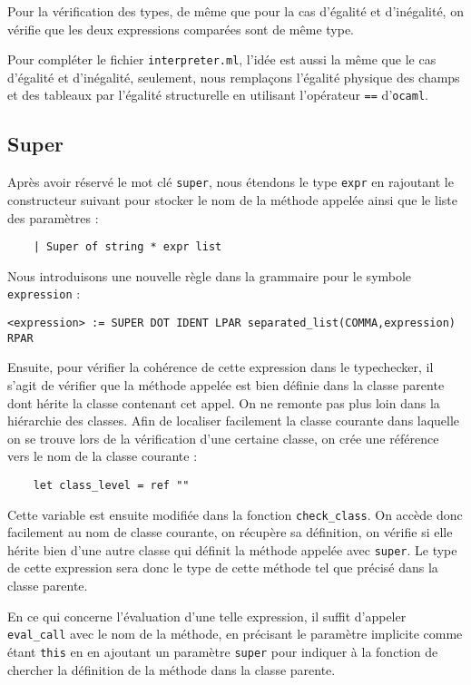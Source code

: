 \documentclass{article}
\begin{document}
Pour la vérification des types, de même que pour la cas d'égalité et d'inégalité, on vérifie que les deux expressions comparées sont de même type.

Pour compléter le fichier \texttt{interpreter.ml}, l'idée est aussi la même que le cas d'égalité et d'inégalité, seulement, 
nous remplaçons l'égalité physique des champs et des tableaux par l'égalité structurelle en utilisant l'opérateur \texttt{==} d'\texttt{ocaml}.

\subsection{Super}
Après avoir réservé le mot clé \texttt{super}, nous étendons le type \texttt{expr} en rajoutant 
le constructeur suivant pour stocker le nom de la méthode appelée ainsi que le liste des paramètres : 
\begin{verbatim}
    | Super of string * expr list
\end{verbatim}

Nous introduisons une nouvelle règle dans la grammaire pour le symbole \texttt{expression} : 
\begin{lstlisting}[style=mystyle]
    <expression> := SUPER DOT IDENT LPAR separated_list(COMMA,expression) RPAR 
\end{lstlisting}

Ensuite, pour vérifier la cohérence de cette expression dans le typechecker, il s'agit de vérifier que la méthode appelée est bien définie dans la classe parente 
dont hérite la classe contenant cet appel. On ne remonte pas plus loin dans la hiérarchie des classes.
Afin de localiser facilement la classe courante dans laquelle on se trouve lors de la vérification d'une certaine 
classe, on crée une référence vers le nom de la classe courante : 
\begin{verbatim}
    let class_level = ref ""
\end{verbatim}

Cette variable est ensuite modifiée dans la fonction \texttt{check\_class}.
On accède donc facilement au nom de classe courante, on récupère sa définition, on vérifie si elle hérite bien d'une 
autre classe qui définit la méthode appelée avec \texttt{super}. Le type de cette expression sera donc 
le type de cette méthode tel que précisé dans la classe parente.

En ce qui concerne l'évaluation d'une telle expression, il suffit 
d'appeler \texttt{eval\_call} avec le nom de la méthode, en précisant le 
paramètre implicite comme étant \texttt{this} en en ajoutant un paramètre \texttt{super}
pour indiquer à la fonction de chercher la définition de la méthode 
dans la classe parente.
\end{document}
